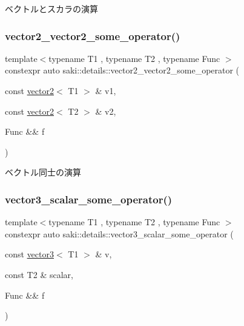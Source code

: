 ベクトルとスカラの演算 

\mbox{\label{namespacesaki_1_1details_a83d5020a51b57f3b8f8166e785861cc5}} 
\subsubsection{\texorpdfstring{vector2\+\_\+vector2\+\_\+some\+\_\+operator()}{vector2\_vector2\_some\_operator()}}
{\footnotesize\ttfamily template$<$typename T1 , typename T2 , typename Func $>$ \\
constexpr auto saki\+::details\+::vector2\+\_\+vector2\+\_\+some\+\_\+operator (\begin{DoxyParamCaption}\item[{const \mbox{\hyperlink{classsaki_1_1vector2}{vector2}}$<$ T1 $>$ \&}]{v1,  }\item[{const \mbox{\hyperlink{classsaki_1_1vector2}{vector2}}$<$ T2 $>$ \&}]{v2,  }\item[{Func \&\&}]{f }\end{DoxyParamCaption})}



ベクトル同士の演算 

\mbox{\label{namespacesaki_1_1details_a66b715797dcf04fae99e5cd60ea82cb3}} 
\subsubsection{\texorpdfstring{vector3\+\_\+scalar\+\_\+some\+\_\+operator()}{vector3\_scalar\_some\_operator()}}
{\footnotesize\ttfamily template$<$typename T1 , typename T2 , typename Func $>$ \\
constexpr auto saki\+::details\+::vector3\+\_\+scalar\+\_\+some\+\_\+operator (\begin{DoxyParamCaption}\item[{const \mbox{\hyperlink{classsaki_1_1vector3}{vector3}}$<$ T1 $>$ \&}]{v,  }\item[{const T2 \&}]{scalar,  }\item[{Func \&\&}]{f }\end{DoxyParamCaption})}



